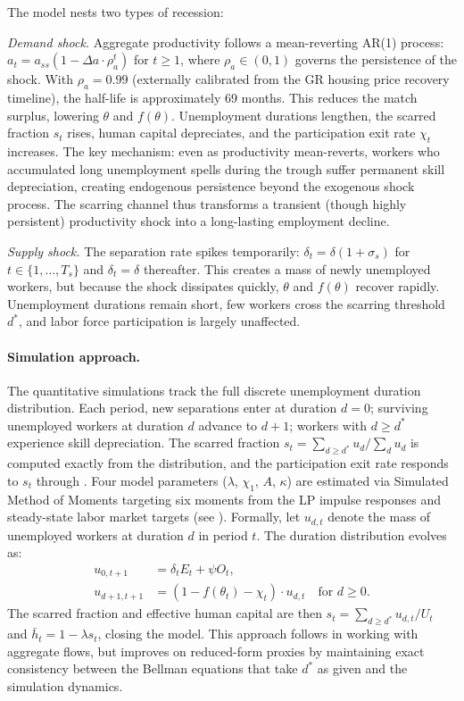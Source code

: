 \documentclass[12pt]{article}
\begin{document}
The model nests two types of recession:

\textit{Demand shock.} Aggregate productivity follows a mean-reverting AR(1) process: $a_t = a_{ss}(1 - \Delta a \cdot \rho_a^t)$ for $t \geq 1$, where $\rho_a \in (0,1)$ governs the persistence of the shock. With $\rho_a = 0.99$ (externally calibrated from the GR housing price recovery timeline), the half-life is approximately 69 months. This reduces the match surplus, lowering $\theta$ and $f(\theta)$. Unemployment durations lengthen, the scarred fraction $s_t$ rises, human capital depreciates, and the participation exit rate $\chi_t$ increases. The key mechanism: even as productivity mean-reverts, workers who accumulated long unemployment spells during the trough suffer permanent skill depreciation, creating endogenous persistence beyond the exogenous shock process. The scarring channel thus transforms a transient (though highly persistent) productivity shock into a long-lasting employment decline.

\textit{Supply shock.} The separation rate spikes temporarily: $\delta_t = \delta(1 + \sigma_s)$ for $t \in \{1, \ldots, T_s\}$ and $\delta_t = \delta$ thereafter. This creates a mass of newly unemployed workers, but because the shock dissipates quickly, $\theta$ and $f(\theta)$ recover rapidly. Unemployment durations remain short, few workers cross the scarring threshold $d^*$, and labor force participation is largely unaffected.

\paragraph{Simulation approach.}\label{sec:simulation_approach} The quantitative simulations track the full discrete unemployment duration distribution. Each period, new separations enter at duration $d = 0$; surviving unemployed workers at duration $d$ advance to $d + 1$; workers with $d \geq d^*$ experience skill depreciation. The scarred fraction $s_t = \sum_{d \geq d^*} u_d / \sum_d u_d$ is computed exactly from the distribution, and the participation exit rate responds to $s_t$ through . Four model parameters ($\lambda$, $\chi_1$, $A$, $\kappa$) are estimated via Simulated Method of Moments targeting six moments from the LP impulse responses and steady-state labor market targets (see ). Formally, let $u_{d,t}$ denote the mass of unemployed workers at duration $d$ in period $t$. The duration distribution evolves as:
\begin{align}
u_{0,t+1} &= \delta_t E_t + \psi O_t, \label{eq:dur_inflow} \\
u_{d+1,t+1} &= (1 - f(\theta_t) - \chi_t) \cdot u_{d,t} \quad \text{for } d \geq 0. \label{eq:dur_recursion}
\end{align}
The scarred fraction and effective human capital are then $s_t = \sum_{d \geq d^*} u_{d,t} / U_t$ and $\bar{h}_t = 1 - \lambda s_t$, closing the model. This approach follows \citet{shimer2005cyclical} in working with aggregate flows, but improves on reduced-form proxies by maintaining exact consistency between the Bellman equations that take $d^*$ as given and the simulation dynamics.
\end{document}
